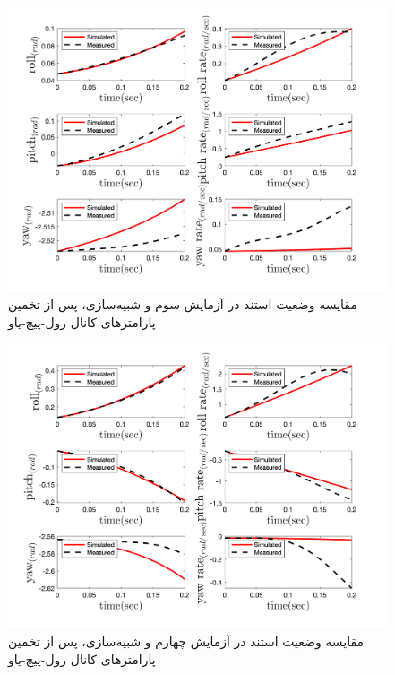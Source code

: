 \begin{figure}[H]
	\includegraphics[width=12cm]{../Figures/RCP/roll_pitch_yaw_parameter_estimation/RCP_roll_pitch_yaw_S3.png}
	\centering
	\caption{مقايسه وضعیت استند در  آزمايش سوم و شبیه‌سازی، پس از تخمین پارامترهای کانال رول-پیچ-یاو}
	\label{ roll_pitch_yaw_ps3}
\end{figure}
\begin{figure}[H]
	\includegraphics[width=12cm]{../Figures/RCP/roll_pitch_yaw_parameter_estimation/RCP_roll_pitch_yaw_S5.png}
	\centering
	\caption{مقايسه وضعیت استند در  آزمايش چهارم و شبیه‌سازی، پس از تخمین پارامترهای کانال رول-پیچ-یاو}
	\label{ roll_pitch_yaw_ps4}
\end{figure}
